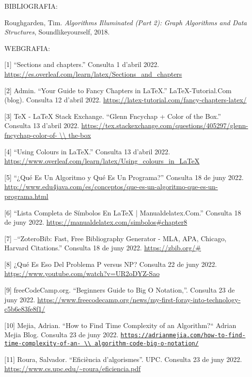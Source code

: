 {\large BIBLIOGRAFIA:}

Roughgarden, Tim. \textit{Algorithms Illuminated (Part 2): Graph Algorithms and Data Structures}, Soundlikeyourself, 2018. 

\vspace{1cm}

{\large WEBGRAFIA:}

[1] “Sections and chapters.” Consulta 1 d’abril 2022. \url{https://es.overleaf.com/learn/latex/Sections_and_chapters}

[2] Admin. “Your Guide to Fancy Chapters in LaTeX.” LaTeX-Tutorial.Com (blog). Consulta 12 d’abril 2022. \url{https://latex-tutorial.com/fancy-chapters-latex/}

[3] TeX - LaTeX Stack Exchange. “Glenn Fncychap + Color of the Box.” Consulta 13 d’abril 2022. \url{https://tex.stackexchange.com/questions/405297/glenn-fncychap-color-of- \\ the-box} 

[4] “Using Colours in LaTeX.” Consulta 13 d’abril 2022. \url{https://www.overleaf.com/learn/latex/Using_colours_in_LaTeX}

[5] “¿Qué Es Un Algoritmo y Qué Es Un Programa?” Consulta 18 de juny 2022. \url{http://www.edu4java.com/es/conceptos/que-es-un-algoritmo-que-es-un-programa.html}

[6] “Lista Completa de Símbolos En LaTeX | Manualdelatex.Com.” Consulta 18 de juny 2022. \url{https://manualdelatex.com/simbolos#chapter8}

[7] --“ZoteroBib: Fast, Free Bibliography Generator - MLA, APA, Chicago, Harvard Citations.” Consulta 18 de juny 2022.   \url{https://zbib.org/#}

[8] ¿Qué Es Eso Del Problema P versus NP? Consulta 22 de juny 2022. \url{https://www.youtube.com/watch?v=UR2oDYZ-Sao}

[9] freeCodeCamp.org. “Beginners Guide to Big O Notation,”. Consulta 23 de juny 2022. \url{https://www.freecodecamp.org/news/my-first-foray-into-technology-c5b6e83fe8f1/}

[10] Mejia, Adrian. “How to Find Time Complexity of an Algorithm?“ Adrian Mejia Blog. Consulta 23 de juny 2022. \href{https://adrianmejia.com/how-to-find-time-complexity-of-an-algorithm-code-big-o-notation/}{\nolinkurl{https://adrianmejia.com/how-to-find-time-complexity-of-an- \\ algorithm-code-big-o-notation/}}

[11] Roura, Salvador. “Eficiència d’algorismes”. UPC. Consulta 23 de juny 2022. \url{https://www.cs.upc.edu/~roura/eficiencia.pdf}

